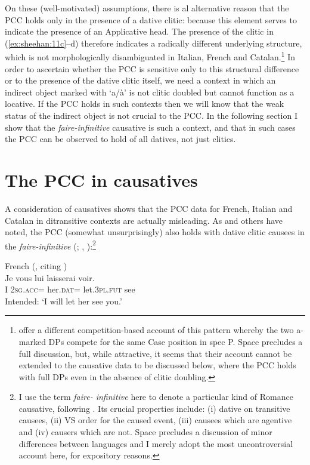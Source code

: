 \documentclass[output=paper,colorlinks,citecolor=brown,nonflat]{langsci/langscibook}
\begin{document}
On these (well-motivated) assumptions, there is al alternative reason that the PCC holds only in the presence of a dative clitic:  because this element serves to indicate the presence of an Applicative head. The presence of the clitic in (\ref{ex:sheehan:11c}--d) therefore indicates a radically different underlying structure, which is not morphologically disambiguated in Italian, French and Catalan.\footnote{\citet{OrmazabalRomero2013Borealis} offer a different competition-based account of this pattern whereby the two a-marked DPs compete for the same Case position in spec \liv P. Space precludes a full discussion, but, while attractive, it seems that their account cannot be extended to the causative data to be discussed below, where the PCC holds with full DPs even in the absence of clitic doubling.} In order to ascertain whether the PCC is sensitive only to this structural difference or to the presence of the dative clitic itself, we need a context in which an indirect object marked with ‘a/à’ is not clitic doubled but cannot function as a locative. If the PCC holds in such contexts then we will know that the weak status of the indirect object is not crucial to the PCC. In the following section I show that the \textit{faire-infinitive} causative is such a context, and that in such cases the PCC can be observed to hold of all datives, not just clitics.

\section{The PCC in causatives}\label{sec:sheehan:3}

A consideration of causatives shows that the PCC data for French, Italian and Catalan in ditransitive contexts are actually misleading. As \citet{Bonet1991} and others have noted, the PCC (somewhat unsurprisingly) also holds with dative clitic causees in the \textit{faire-infinitive} (\citealt{Postal1981}; \citealt{Quicoli1984}, \citealt{Rezac2008}):\footnote{I use the term \emph{faire- infinitive} here to denote a particular kind of Romance causative, following \citet{Kayne1975}. Its crucial properties include: (i) dative on transitive causees, (ii) VS order for the caused event, (iii) causees which are agentive and (iv) causers which are not. Space precludes a discussion of minor differences between languages and I merely adopt the most uncontroversial account here, for expository reasons.}

\ea%
    \label{ex:sheehan:13}
    French (\citealt[66]{Rezac2008}, citing \citealt{Postal1981, Quicoli1984})\\
    \gll    *Je   vous     lui           laisserai   voir.\\
            I      2\textsc{sg}.\textsc{acc}=   her.\textsc{dat=}   let.3\textsc{pl}.\textsc{fut}    see\\
    \glt    Intended: ‘I will let her see you.'
\z
\end{document}
